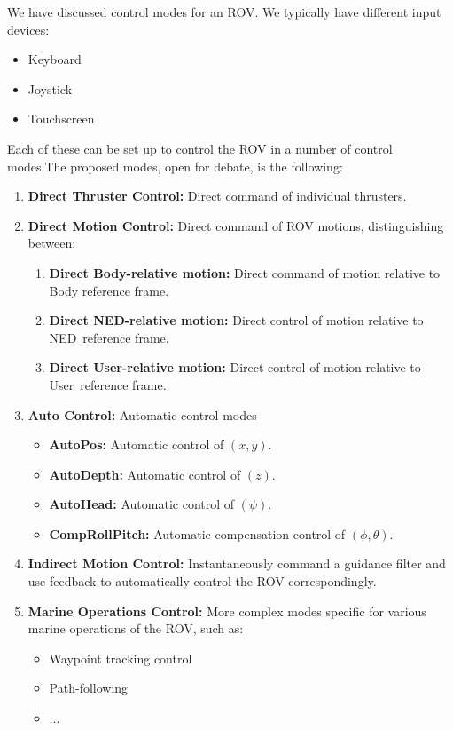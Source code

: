 \documentclass[a4paper,twoside,english]{report}
\begin{document}
We have discussed control modes for an ROV. We typically have different
input devices:
\begin{itemize}
\item Keyboard
\item Joystick
\item Touchscreen 
\end{itemize}
Each of these can be set up to control the ROV in a number of control
modes.The proposed modes, open for debate, is the following:
\begin{enumerate}
\item \textbf{Direct Thruster Control:} Direct command of individual thrusters.
\item \textbf{Direct Motion Control:} Direct command of ROV motions, distinguishing
between:

\begin{enumerate}
\item \textbf{Direct Body-relative motion:} Direct command of motion relative
to Body reference frame.
\item \textbf{Direct NED-relative motion:} Direct control of motion relative
to NED\ reference frame.
\item \textbf{Direct User-relative motion:} Direct control of motion relative
to User\ reference frame. 
\end{enumerate}
\item \textbf{Auto Control:} Automatic control modes

\begin{itemize}
\item \textbf{AutoPos:} Automatic control of $(x,y)$.
\item \textbf{AutoDepth:} Automatic control of $(z)$.
\item \textbf{AutoHead:} Automatic control of $(\psi)$.
\item \textbf{CompRollPitch:} Automatic compensation control of $(\phi,\theta)$. 
\end{itemize}
\item \textbf{Indirect Motion Control:} Instantaneously command a guidance
filter and use feedback to automatically control the ROV correspondingly.
\item \textbf{Marine Operations Control:} More complex modes specific for
various marine operations of the ROV, such as:

\begin{itemize}
\item Waypoint tracking control
\item Path-following
\item ... 
\end{itemize}
\end{enumerate}
\end{document}
